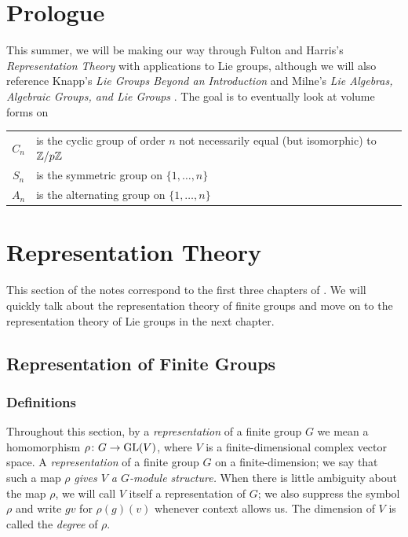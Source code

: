 \chapter{Prologue}
This summer, we will be making our way through Fulton and Harris's
\emph{Representation Theory} \cite{fultor-harris} with applications to Lie
groups, although we will also reference Knapp's \emph{Lie Groups Beyond an
  Introduction} \cite{knapp} and Milne's \emph{Lie Algebras, Algebraic
  Groups, and Lie Groups} \cite{milneLAG}. The goal is to eventually look
at volume forms on

\begin{tabular}{cl}
  $C_n$  & is the cyclic group of order $n$ not necessarily equal
           (but isomorphic) to $\mathbb{Z}/p\mathbb{Z}$\\
  $S_n$ & is the symmetric group on $\{1,\dotsc,n\}$\\
  $A_n$ & is the alternating group on $\{1,\dotsc,n\}$\\
\end{tabular}

\newpage
\chapter{Representation Theory}
This section of the notes correspond to the first three chapters of
\cite{fultor-harris}. We will quickly talk about the representation theory
of finite groups and move on to the representation theory of Lie groups in
the next chapter.
\section{Representation of Finite Groups}
\subsection{Definitions}
Throughout this section, by a \emph{representation} of a finite group $G$
we mean a homomorphism $\rho\colon G\to\mathrm{GL}(V)$, where $V$ is a
finite-dimensional complex vector space. A \emph{representation} of a
finite group $G$ on a finite-dimension; we say that such a map $\rho$
\emph{gives $V$ a $G$-module structure.} When there is little ambiguity
about the map $\rho$, we will call $V$ itself a representation of $G$; we
also suppress the symbol $\rho$ and write $gv$ for $\rho(g)(v)$
whenever context allows us. The dimension of $V$ is called the \emph{degree} of
$\rho$.

